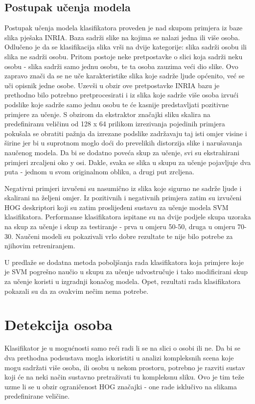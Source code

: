 \documentclass[times, utf8, seminar, numeric]{fer}
\begin{document}
\subsection{Postupak učenja modela}
Postupak učenja modela klasifikatora proveden je nad skupom primjera iz baze slika pješaka INRIA. Baza sadrži slike na kojima se nalazi jedna ili više osoba. Odlučeno je da se klasifikacija slika vrši na dvije kategorije: slika sadrži osobu ili slika ne sadrži osobu. Pritom postoje neke pretpostavke o slici koja sadrži neku osobu - slika sadrži samo jednu osobu, te ta osoba zauzima veći dio slike. Ovo zapravo znači da se ne uče karakteristike slika koje sadrže ljude općenito, već se uči opisnik jedne osobe. Uzevši u obzir ove pretpostavke INRIA bazu je prethodno bilo potrebno pretprocesirati i iz slika koje sadrže više osoba izvući podslike koje sadrže samo jednu osobu te će kasnije predstavljati pozitivne primjere za učenje. S obzirom da ekstraktor značajki sliku skalira na predefiniranu veličinu od 128 x 64 prilikom izrezivanja pojedinih primjera pokušala se obratiti pažnja da izrezane podslike zadržavaju taj isti omjer visine i širine jer bi u suprotnom moglo doći do prevelikih distorzija slike i narušavanja naučenog modela. Da bi se dodatno poveća skup za učenje, svi su ekstrahirani primjeri zrcaljeni oko y osi. Dakle, svaka se slika u skupu  za učenje pojavljuje dva puta - jednom u svom originalnom obliku, a drugi put zrcljena.

Negativni primjeri izvučeni su nasumično iz slika koje sigurno ne sadrže ljude i skalirani na željeni omjer. Iz pozitivnih i negativnih primjera zatim su izvučeni HOG deskriptori koji su zatim proslijeđeni sustavu za učenje modela SVM klasifikatora. Performanse klasifikatora ispitane su na dvije podjele skupa uzoraka na skup za učenje i skup za testiranje - prva u omjeru 50-50, druga u omjeru 70-30. Naučeni modeli su pokazivali vrlo dobre rezultate te nije bilo potrebe za njihovim retreniranjem.

U \cite{hog} predlaže se dodatna metoda poboljšanja rada klasifikatora koja primjere koje je SVM pogrešno naučio u skupu za učenje udvostručuje i tako modificirani skup za učenje koristi u izgradnji konačog modela. Opet, rezultati rada klasifikatora pokazali su da za ovakvim nečim nema potrebe.

\section{Detekcija osoba}
Klasifikator je u mogućnosti samo reći radi li se na slici o osobi ili ne. Da bi se dva prethodna podsustava mogla iskoristiti u analizi kompleksnih scena koje mogu sadržati više osoba, ili osobu u nekom prostoru, potrebno je razviti sustav koji će na neki način sustavno pretraživati tu kompleksnu sliku. Ovo je tim teže uzme li se u obzir ograničenost HOG značajki - one rade isklučivo na slikama predefinirane veličine.
\end{document}
